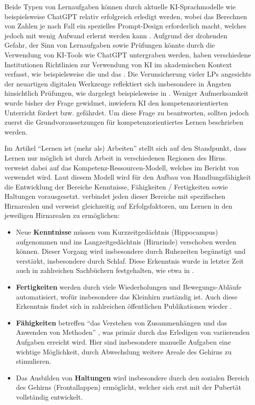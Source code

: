 Beide Typen von Lernaufgaben können durch aktuelle \gls{KI}-Sprachmodelle wie beispielsweise ChatGPT relativ erfolgreich erledigt werden, wobei das Berechnen von Zahlen je nach Fall ein spezielles Prompt-Design erforderlich macht, welches jedoch mit wenig Aufwand erlernt werden kann \cite{bfh}. Aufgrund der drohenden Gefahr, der Sinn von Lernaufgaben sowie Prüfungen könnte durch die Verwendung von \gls{KI}-Tools wie ChatGPT untergraben werden, haben verschiedene Institutionen Richtlinien zur Verwendung von \gls{KI} im akademischen Kontext verfasst, wie beispielsweise die \textcite{bfh} und das \textcite{bbz}. Die Verunsicherung vieler \glspl{LP} angesichts der neuartigen digitalen Werkzeuge reflektiert sich insbesondere in Ängsten hinsichtlich Prüfungen, wie dargelegt beispielsweise in \cite{bund}. Weniger Aufmerksamkeit wurde bisher der Frage gewidmet, inwiefern \gls{KI} den kompetenzorientierten Unterricht fördert bzw. gefährdet. Um diese Frage zu beantworten, sollten jedoch zuerst die Grundvoraussetzungen für kompetenzorientiertes Lernen beschrieben werden.

Im Artikel \enquote{Lernen ist (mehr als) Arbeiten} stellt sich \textcite{nzzfolio} auf den Standpunkt, dass Lernen nur möglich ist durch Arbeit in verschiedenen Regionen des Hirns. \textcite{nzzfolio} verweist dabei auf das Kompetenz-Ressourcen-Modell, welches im Bericht von \textcite{sbfi2} verwendet wird. Laut diesem Modell wird für den Aufbau von Handlungsfähigkeit die Entwicklung der Bereiche Kenntnisse, Fähigkeiten / Fertigkeiten sowie Haltungen vorausgesetzt. \textcite{nzzfolio} verbindet jeden dieser Bereiche mit spezifischen Hirnarealen und verweist gleichzeitig auf Erfolgsfaktoren, um Lernen in den jeweiligen Hirnarealen zu ermöglichen:
\begin{itemize}
    \item Neue \textbf{Kenntnisse} müssen vom Kurzzeitgedächtnis (Hippocampus) aufgenommen und ins Langzeitgedächtnis (Hirnrinde) verschoben werden können. Dieser Vorgang wird insbesondere durch Ruhezeiten begünstigt und verstärkt, insbesondere durch Schlaf. Diese Erkenntnis wurde in letzter Zeit auch in zahlreichen Sachbüchern festgehalten, wie etwa in \parencite{alma99116800416405511}.
    \item \textbf{Fertigkeiten} werden durch viele Wiederholungen und Bewegungs-Abläufe automatisiert, wofür insbesondere das Kleinhirn zuständig ist. Auch diese Erkenntnis findet sich in zahlreichen öffentlichen Publikationen wieder \cite{huberman}.
    \item \textbf{Fähigkeiten} betreffen \enquote{das Verstehen von Zusammenhängen und das Anwenden von Methoden} \parencite{nzzfolio}, was primär durch das Erledigen von variierenden Aufgaben erreicht wird. Hier sind insbesondere manuelle Aufgaben eine wichtige Möglichkeit, durch Abwechslung weitere Areale des Gehirns zu stimulieren.
    \item Das Ausbilden von \textbf{Haltungen} wird insbesondere durch den sozialen Bereich des Gehirns (Frontallappen) ermöglicht, welcher sich erst mit der Pubertät vollständig entwickelt.
\end{itemize}

